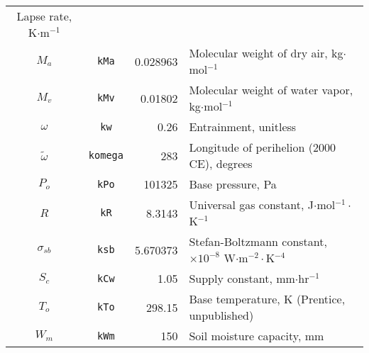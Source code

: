\begin{longtable}{c c r p{6cm}}
        Lapse rate, K$\cdot$m$^{-1}$ 
        \parencite{allen73} \\
    $M_a$ & \texttt{kMa} & 0.028963 &
        Molecular weight of dry air, kg$\cdot$mol$^{-1}$ 
        \parencite{tsilingiris08} \\
    $M_v$ & \texttt{kMv} & 0.01802 &
        Molecular weight of water vapor, kg$\cdot$mol$^{-1}$
        \parencite{tsilingiris08} \\
	$\omega$ & \texttt{kw} & 0.26 & 
        Entrainment, unitless 
        \parencite{lhomme97,priestley72} \\    
    $\tilde{\omega}$ & \texttt{komega} & 283 & 
        Longitude of perihelion (2000 CE), degrees 
        \parencite{berger78} \\
    $P_o$ & \texttt{kPo} & 101325 &
        Base pressure, Pa 
        \parencite{allen73} \\
    $R$ & \texttt{kR} & 8.3143 &
        Universal gas constant, J$\cdot$mol$^{-1}\cdot$K$^{-1}$ 
        \parencite{allen73} \\
    $\sigma_{sb}$ & \texttt{ksb} & 5.670373 &
        Stefan-Boltzmann constant, $\times 10^{-8}$ 
        W$\cdot$m$^{-2}\cdot$K$^{-4}$ \\
    $S_c$ & \texttt{kCw} & 1.05 & 
        Supply constant, mm$\cdot$hr$^{-1}$  
        \parencite{federer82} \\
    $T_o$ & \texttt{kTo} & 298.15 &
        Base temperature, K 
        (Prentice, unpublished) \\
    $W_m$ & \texttt{kWm} & 150 &
        Soil moisture capacity, mm  
        \parencite{cramer88} \\
        \hline
\end{longtable}

